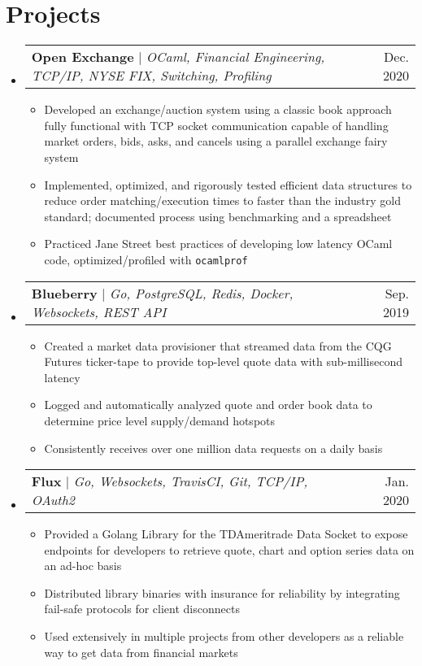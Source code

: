 \documentclass[letterpaper,11pt]{article}
\makeatletter
\newcommand{\resumeItem}[1]{
  \item\small{
    {#1 \vspace{-3pt}}
  }
}
\newcommand{\resumeProjectHeading}[2]{
    \item
    \begin{tabular*}{0.97\textwidth}{l@{\extracolsep{\fill}}r}
      \small#1 & #2 \\
    \end{tabular*}\vspace{-7pt}
}
\newcommand{\resumeSubHeadingListStart}{\begin{itemize}[leftmargin=0.15in, label={}]}
\newcommand{\resumeSubHeadingListEnd}{\end{itemize}}
\newcommand{\resumeItemListStart}{\begin{itemize}}
\newcommand{\resumeItemListEnd}{\end{itemize}\vspace{-5pt}}
\makeatother
\begin{document}
\section{Projects}
    \resumeSubHeadingListStart
      \resumeProjectHeading
          {\textbf{Open Exchange} $|$ \emph{OCaml, Financial Engineering, TCP/IP, NYSE FIX, Switching, Profiling}}{Dec. 2020}
          \resumeItemListStart
            \resumeItem{Developed an exchange/auction system using a classic book approach fully functional with TCP socket communication capable of handling market orders, bids, asks, and cancels using a parallel exchange fairy system}
            \resumeItem{Implemented, optimized, and rigorously tested efficient data structures to reduce order matching/execution times to faster than the industry gold standard; documented process using benchmarking and a spreadsheet}
            \resumeItem{Practiced Jane Street best practices of developing low latency OCaml code, optimized/profiled with \texttt{ocamlprof}}
          \resumeItemListEnd
    
      \resumeProjectHeading
          {\textbf{Blueberry} $|$ \emph{Go, PostgreSQL, Redis, Docker, Websockets, REST API}}{Sep. 2019}
          \resumeItemListStart
            \resumeItem{Created a market data provisioner that streamed data from the CQG Futures ticker-tape to provide top-level quote data with sub-millisecond latency}
            \resumeItem{Logged and automatically analyzed quote and order book data to determine price level supply/demand hotspots}
            \resumeItem{Consistently receives over one million data requests on a daily basis}
          \resumeItemListEnd
      \resumeProjectHeading
          {\textbf{Flux} $|$ \emph{Go, Websockets, TravisCI, Git, TCP/IP, OAuth2}}{Jan. 2020}
          \resumeItemListStart
            \resumeItem{Provided a Golang Library for the TDAmeritrade Data Socket to expose endpoints for developers to retrieve quote, chart and option series data on an ad-hoc basis}
            \resumeItem{Distributed library binaries with insurance for reliability by integrating fail-safe protocols for client disconnects}
            \resumeItem{Used extensively in multiple projects from other developers as a reliable way to get data from financial markets}
          \resumeItemListEnd
    \resumeSubHeadingListEnd
\end{document}
